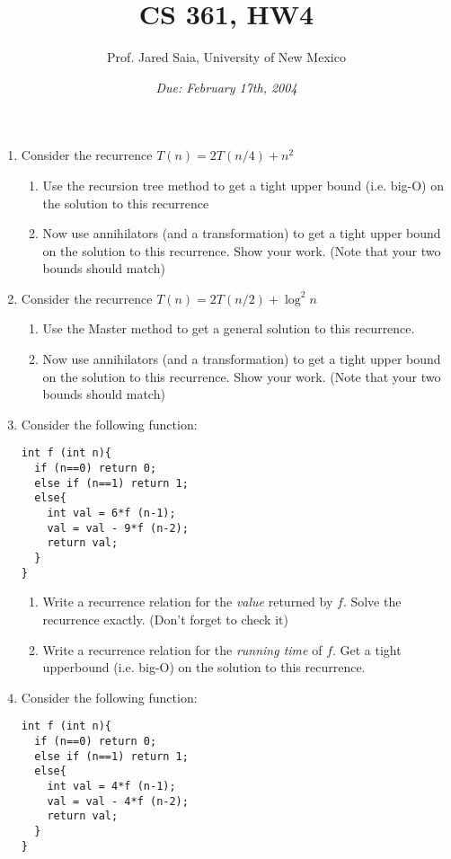 \documentclass[11pt]{article}
\begin{document}
\title{CS 361, HW4}

\author {Prof. Jared Saia, University of New Mexico}

\date{\emph{Due: February 17th, 2004}}
\maketitle

\begin{enumerate}

\item 
Consider the recurrence $T (n) = 2T (n/4) + n^{2}$
\begin{enumerate}
\item Use the recursion tree method to get a tight upper bound
(i.e. big-O) on the solution to this recurrence
\item Now use annihilators (and a transformation) to get a tight upper
bound on the solution to this recurrence.  Show your work.  (Note that
your two bounds should match)
\end{enumerate}

\item 
Consider the recurrence $T (n) = 2T (n/2) + \log^{2} n$
\begin{enumerate}
\item Use the Master method to get a general solution to this
recurrence.
\item Now use annihilators (and a transformation) to get a tight upper
bound on the solution to this recurrence.  Show your work.  (Note that
your two bounds should match)
\end{enumerate}

\item Consider the following function:
\begin{verbatim}
int f (int n){
  if (n==0) return 0;
  else if (n==1) return 1;
  else{
    int val = 6*f (n-1);
    val = val - 9*f (n-2);
    return val;
  }
}
\end{verbatim}

\begin{enumerate}
\item Write a recurrence relation for the \emph{value} returned by
$f$.  Solve the recurrence exactly.  (Don't forget to check it)
\item Write a recurrence relation for the \emph{running time} of $f$.
Get a tight upperbound (i.e. big-O) on the solution to this
recurrence. 
\end{enumerate}


\item Consider the following function:
\begin{verbatim}
int f (int n){
  if (n==0) return 0;
  else if (n==1) return 1;
  else{
    int val = 4*f (n-1);
    val = val - 4*f (n-2);
    return val;
  }
}
\end{verbatim}


\end{enumerate}
\end{document}
